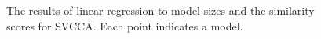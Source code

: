 \documentclass[letterpaper]{article} %
\begin{document}
\begin{figure}[t]
	\centering
	\caption{The results of linear regression to model sizes and the similarity scores for SVCCA. Each point indicates a model.}
	\label{Fig.model_size_compare_svcca}
\end{figure}
\end{document}
